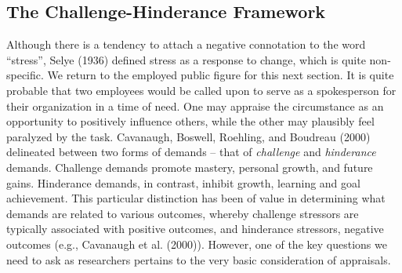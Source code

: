 \documentclass[
  english,
  man]{apa6}
\begin{document}
\hypertarget{the-challenge-hinderance-framework}{%
\subsection{The Challenge-Hinderance Framework}\label{the-challenge-hinderance-framework}}

Although there is a tendency to attach a negative connotation to the word \enquote{stress}, Selye (1936) defined stress as a response to change, which is quite non-specific. We return to the employed public figure for this next section. It is quite probable that two employees would be called upon to serve as a spokesperson for their organization in a time of need. One may appraise the circumstance as an opportunity to positively influence others, while the other may plausibly feel paralyzed by the task. Cavanaugh, Boswell, Roehling, and Boudreau (2000) delineated between two forms of demands -- that of \emph{challenge} and \emph{hinderance} demands. Challenge demands promote mastery, personal growth, and future gains. Hinderance demands, in contrast, inhibit growth, learning and goal achievement. This particular distinction has been of value in determining what demands are related to various outcomes, whereby challenge stressors are typically associated with positive outcomes, and hinderance stressors, negative outcomes (e.g., Cavanaugh et al. (2000)). However, one of the key questions we need to ask as researchers pertains to the very basic consideration of appraisals.
\end{document}
